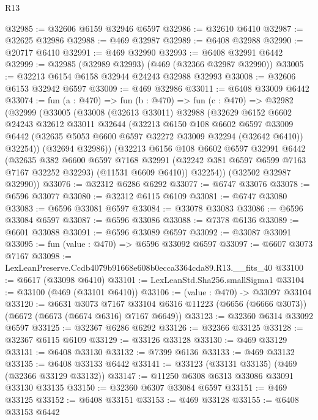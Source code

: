 \begin{lexlean}{R13}
\begin{coremodule}
@32985 := @32606 @6159 @32946 @6597
@32986 := @32610 @6410
@32987 := @32625 @32986
@32988 := @469 @32987
@32989 := @6408 @32988
@32990 := @20717 @6410
@32991 := @469 @32990
@32993 := @6408 @32991 @6442
@32999 := @32985 (@32989 @32993) (@469 (@32366 @32987 @32990))
@33005 := @32213 @6154 @6158 @32944 @24243 @32988 @32993
@33008 := @32606 @6153 @32942 @6597
@33009 := @469 @32986
@33011 := @6408 @33009 @6442
@33074 := fun (a : @470) =>
  fun (b : @470) =>
  fun (c : @470) =>
  @32982
    (@32999
      (@33005
        (@33008
          (@32613 @33011)
          @32988
          (@32629
            @6152
            @6602
            @24243
            @32612
            @33011
            @32644
            (@32213
              @6150
              @108
              @6602
              @6597
              @33009
              @6442
              (@32635 @5053 @6600 @6597 @32272 @33009 @32294 (@32642 @6410))
              @32254))
          (@32694 @32986))
        (@32213
          @6156
          @108
          @6602
          @6597
          @32991
          @6442
          (@32635
            @382
            @6600
            @6597
            @7168
            @32991
            (@32242 @381 @6597 @6599 @7163 @7167 @32252 @32293)
            (@11531 @6609 @6410))
          @32254))
      (@32502 @32987 @32990))
@33076 := @32312 @6286 @6292
@33077 := @6747 @33076
@33078 := @6596 @33077
@33080 := @32312 @6115 @6109
@33081 := @6747 @33080
@33083 := @6596 @33081 @6597
@33084 := @33078 @33083
@33086 := @6596 @33084 @6597
@33087 := @6596 @33086
@33088 := @7378 @6136
@33089 := @6601 @33088
@33091 := @6596 @33089 @6597
@33092 := @33087 @33091
@33095 := fun (value : @470) => @6596 @33092 @6597
@33097 := @6607 @3073 @7167
@33098 := LexLeanPreserve.Ccdb4079b91668e608b0ecca3364cda89.R13.__fits_40
@33100 := @6617 (@33098 @6410)
@33101 := LexLeanStd.Sha256.smallSigma1
@33104 := @33100 (@469 (@33101 @6410))
@33106 := (value : @470) -> @33097 @33104
@33120 := @6631
    @3073
    @7167
    @33104
    @6316
    @11223
    (@6656 (@6666 @3073))
    (@6672 (@6673 (@6674 @6316) @7167 @6649))
@33123 := @32360 @6314 @33092 @6597
@33125 := @32367 @6286 @6292
@33126 := @32366 @33125
@33128 := @32367 @6115 @6109
@33129 := @33126 @33128
@33130 := @469 @33129
@33131 := @6408 @33130
@33132 := @7399 @6136
@33133 := @469 @33132
@33135 := @6408 @33133 @6442
@33141 := @33123 (@33131 @33135) (@469 (@32366 @33129 @33132))
@33147 := @11250 @6308 @6313 @33086 @33091 @33130 @33135
@33150 := @32360 @6307 @33084 @6597
@33151 := @469 @33125
@33152 := @6408 @33151
@33153 := @469 @33128
@33155 := @6408 @33153 @6442

\end{coremodule}
\end{lexlean}
